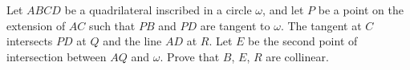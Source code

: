 Let $ABCD$ be a quadrilateral inscribed in a circle $\omega$, and let $P$ be a point on the extension of $AC$ such that $PB$ and $PD$ are tangent to $\omega$.  The tangent at $C$ intersects $PD$ at $Q$ and the line $AD$ at $R$.  Let $E$ be the second point of intersection between $AQ$ and $\omega$. Prove that $B$, $E$, $R$ are collinear.